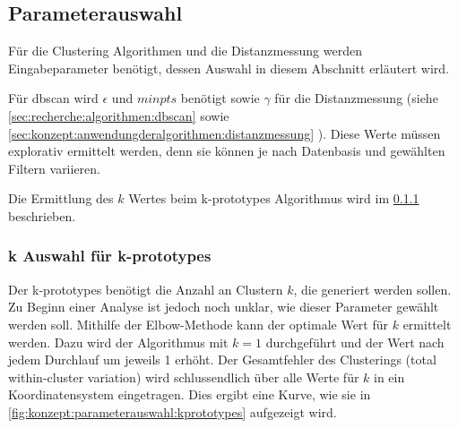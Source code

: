 \subsection{Parameterauswahl}
\label{sec:konzept:parameterauswahl}
Für die Clustering Algorithmen und die Distanzmessung werden Eingabeparameter benötigt, dessen Auswahl in diesem Abschnitt erläutert wird.

Für \gls{dbscan} wird $\epsilon$ und $minpts$ benötigt sowie $\gamma$ für die Distanzmessung (siehe \cref{sec:recherche:algorithmen:dbscan}  sowie \cref{sec:konzept:anwendungderalgorithmen:distanzmessung} ). Diese Werte müssen explorativ ermittelt werden, denn sie können je nach Datenbasis und gewählten Filtern variieren. %

Die Ermittlung des $k$ Wertes beim k-prototypes Algorithmus wird im \cref{sec:konzept:parameterauswahl:kprototypes} beschrieben.

\subsubsection{k Auswahl für k-prototypes}
\label{sec:konzept:parameterauswahl:kprototypes}
Der k-prototypes benötigt die Anzahl an Clustern $k$, die generiert werden sollen. Zu Beginn einer Analyse ist jedoch noch unklar, wie dieser Parameter gewählt werden soll. Mithilfe der Elbow-Methode kann der optimale Wert für $k$ ermittelt werden. Dazu wird der Algorithmus mit $k=1$ durchgeführt und der Wert nach jedem Durchlauf um jeweils 1 erhöht. Der Gesamtfehler des Clusterings (total within-cluster variation) wird schlussendlich über alle Werte für $k$ in ein Koordinatensystem eingetragen. Dies ergibt eine Kurve, wie sie in \cref{fig:konzept:parameterauswahl:kprototypes} aufgezeigt wird.

